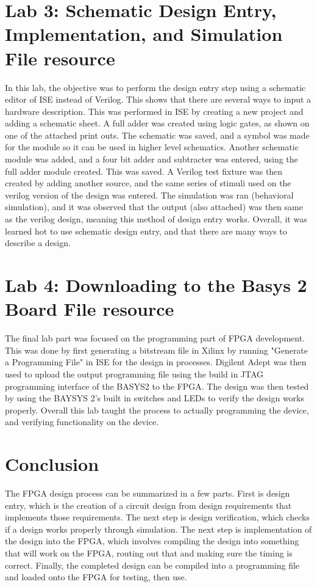 \documentclass[12pt]{article}
\begin{document}
\section{Lab 3: Schematic Design Entry, Implementation, and Simulation File resource}
In this lab, the objective was to perform the design entry step using a schematic editor of ISE instead of Verilog. This shows that there are several ways to input a hardware description. This was performed in ISE by creating a new project and adding a schematic sheet. A full adder was created using logic gates, as shown on one of the attached print outs. The schematic was saved, and a symbol was made for the module so it can be used in higher level schematics. Another schematic module was added, and a four bit adder and subtracter was entered, using the full adder module created. This was saved. A Verilog test fixture was then created by adding another source, and the same series of stimuli used on the verilog version of the design was entered. The simulation was ran (behavioral simulation), and it was observed that the output (also attached) was then same as the verilog design, meaning this method of design entry works. Overall, it was learned hot to use schematic design entry, and that there are many ways to describe a design.
\section{Lab 4: Downloading to the Basys 2 Board File resource}
The final lab part was focused on the programming part of FPGA development. This was done by first generating a bitstream file in Xilinx by running "Generate a Programming File" in ISE for the design in processes. Digilent Adept was then used to upload the output programming file using the build in JTAG programming interface of the BASYS2 to the FPGA. The design was then tested by using the BAYSYS 2's built in switches and LEDs to verify the design works properly. Overall this lab taught the process to actually programming the device, and verifying functionality on the device.
\section{Conclusion}
The FPGA design process can be summarized in a few parts. First is design entry, which is the creation of a circuit design from design requirements that implements those requirements. The next step is design verification, which checks if a design works properly through simulation. The next step is implementation of the design into the FPGA, which involves compiling the design into something that will work on the FPGA, routing out that and making sure the timing is correct. Finally, the completed design can be compiled into a programming file and loaded onto the FPGA for testing, then use.
\end{document}
